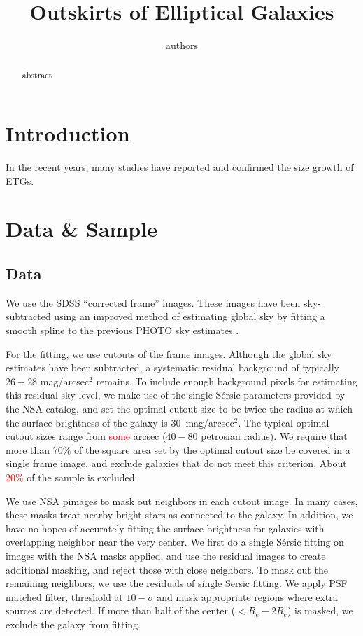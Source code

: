 \documentclass[iop]{emulateapj}
\newcommand{\Sersic}{S\'ersic}
\renewcommand{\Re}{\ensuremath{R_e}}
\newcommand\todo[1]{\textcolor{red}{#1}}
\begin{document}
\title{Outskirts of Elliptical Galaxies}
\author{authors}


\begin{abstract}
    abstract    
\end{abstract}    


\section{Introduction}

In the recent years, many studies have reported and confirmed the size growth
of ETGs.

\section{Data \& Sample}

\subsection{Data}
We use the SDSS ``corrected frame'' images. These images have been
sky-subtracted using an improved method of estimating global sky by fitting
a smooth spline to the previous PHOTO sky estimates
\citep[see][for details]{blanton2011}.

For the fitting, we use cutouts of the frame images.
Although the global sky estimates have been subtracted, a systematic residual
background of typically $26-28$ mag/arcsec$^2$ remains.
To include enough background pixels for estimating this residual sky level,
we make use of the single \Sersic{} parameters provided by the NSA catalog,
and set the optimal cutout size to be twice the radius at which the surface
brightness of the galaxy is 30~mag/arcsec$^2$.
The typical optimal cutout sizes range from
\todo{some} arcsec ($40-80$ petrosian radius).
We require that more than 70\% of the square area set by the optimal cutout
size be covered in a single frame image,
and exclude galaxies that do not meet this criterion.
About \todo{20\%} of the sample is excluded.

We use NSA pimages to mask out neighbors in each cutout image.
In many cases, these masks treat nearby bright stars as connected to the galaxy.
In addition, we have no hopes of accurately fitting the surface brightness
for galaxies with overlapping neighbor near the very center.
We first do a single \Sersic{} fitting on images with the NSA masks applied,
and use the residual images to create additional masking,
and reject those with close neighbors.
To mask out the remaining neighbors, we use the residuals of single Sersic
fitting.
We apply PSF matched filter, threshold at $10-\sigma$ and mask appropriate
regions where extra sources are detected.
If more than half of the center ($< \Re - 2\Re$) is masked, we exclude
the galaxy from fitting.
\end{document}
